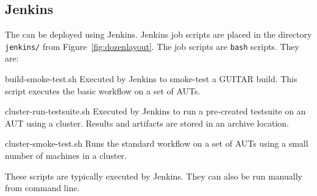 %
%
\subsection{Jenkins}
\label{sec:jenkins}

The \mddozen{} can be deployed using Jenkins. Jenkins job scripts are placed in the directory \texttt{jenkins/} from Figure~\ref{fig:dozenlayout}. The job scripts are \texttt{bash} scripts. They are:\\

\begin{smalldescription}
   \item [build-smoke-test.sh] Executed by Jenkins to smoke-test a GUITAR build. This script executes the basic workflow on a set of \mddozen{} AUTs.

   \item [cluster-run-testsuite.sh] Executed by Jenkins to run a pre-created testsuite on an AUT using a cluster. Results and artifacts are stored in an archive location.

   \item [cluster-smoke-test.sh] Runs the standard workflow on a set of AUTs using a small number of machines in a cluster.\\
\end{smalldescription}

These scripts are typically executed by Jenkins. They can also be run manually from command line.
